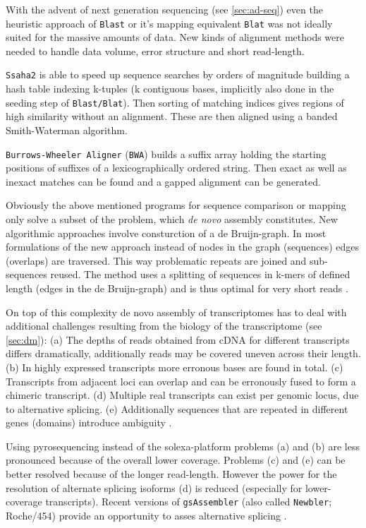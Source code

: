 With the advent of next generation sequencing (see \ref{sec:ad-seq})
even the heuristic approach of \texttt{Blast} or it's mapping
equivalent \texttt{Blat} \cite{pmid11932250} was not ideally suited
for the massive amounts of data. New kinds of alignment methods were
needed to handle data volume, error structure and short read-length.

\texttt{Ssaha2} \cite{pmid11591649} is able to speed up sequence
searches by orders of magnitude building a hash table indexing
k-tuples (k contiguous bases, implicitly also done in the seeding step
of \texttt{Blast/Blat}). Then sorting of matching indices gives
regions of high similarity without an alignment. These are then
aligned using a banded Smith-Waterman algorithm.

\texttt{Burrows-Wheeler Aligner} (\texttt{BWA}) \cite{pmid20080505}
builds a suffix array holding the starting positions of suffixes of a
lexicographically ordered string. Then exact as well as inexact
matches can be found and a gapped alignment can be generated.

Obviously the above mentioned programs for sequence comparison or
mapping only solve a subset of the problem, which \textit{de novo}
assembly constitutes. New algorithmic approaches involve consturction
of a de Bruijn-graph. In most formulations of the new approach instead
of nodes in the graph (sequences) edges (overlaps) are traversed. This
way problematic repeats are joined and sub-sequences reused. The
method uses a splitting of sequences in k-mers of defined length
(edges in the de Bruijn-graph) and is thus optimal for very short
reads \cite{pmid18349386}.

On top of this complexity de novo assembly of transcriptomes has to
deal with additional challenges resulting from the biology of the
transcriptome (see \ref{sec:dm}): (a) The depths of reads obtained
from cDNA for different transcripts differs dramatically, additionally
reads may be covered uneven across their length. (b) In highly
expressed transcripts more erronous bases are found in total. (c)
Transcripts from adjacent loci can overlap and can be erronously fused
to form a chimeric transcript. (d) Multiple real transcripts can exist
per genomic locus, due to alternative splicing. (e) Additionally
sequences that are repeated in different genes (domains) introduce
ambiguity \cite{pmid21572440}.

Using pyrosequencing instead of the solexa-platform problems (a) and
(b) are less pronounced because of the overall lower
coverage. Problems (c) and (e) can be better resolved because of the
longer read-length. However the power for the resolution of alternate
splicing isoforms (d) is reduced (especially for lower-coverage
transcripts). Recent versions of \texttt{gsAssembler} (also called
\texttt{Newbler}; Roche/454) provide an opportunity to asses
alternative splicing \cite{pmid21138572}.

